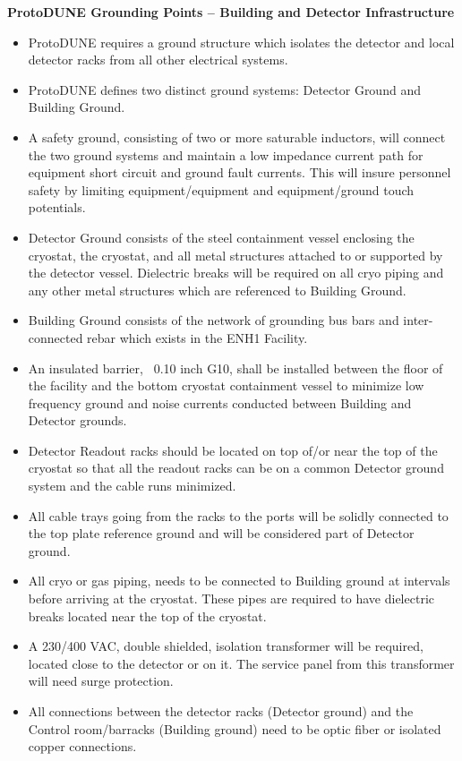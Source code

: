 \textbf{ProtoDUNE Grounding Points – Building and Detector Infrastructure}
\begin{itemize}
\item ProtoDUNE requires a ground structure which isolates the detector and local detector racks from all other electrical systems.
\item ProtoDUNE defines two distinct ground systems:  Detector Ground and Building Ground.
\item A safety ground, consisting of two or more saturable inductors, will connect the two ground systems and maintain a low impedance current path for equipment short circuit and ground fault currents.   This will insure personnel safety by limiting equipment/equipment and equipment/ground touch potentials.
\item Detector Ground consists of the steel containment vessel enclosing the cryostat, the cryostat, and all metal structures attached to or supported by the detector vessel. Dielectric breaks will be required on all cryo piping and any other metal structures which are referenced to Building Ground. 
\item Building Ground consists of the network of grounding bus bars and inter-connected rebar which exists in the ENH1 Facility.
\item An insulated barrier, ~0.10 inch G10, shall be installed between the floor of the facility and the bottom cryostat containment vessel to minimize low frequency ground and noise currents conducted between Building and Detector grounds.
\item Detector Readout racks should be located on top of/or near the top of the cryostat so that all the readout racks can be on a common Detector ground system and the cable runs minimized.
\item All cable trays going from the racks to the ports will be solidly connected to the top plate reference ground and will be considered part of Detector ground.
\item All cryo or gas piping, needs to be connected to Building ground at intervals before arriving at the cryostat. These pipes are required to have dielectric breaks located near the top of the cryostat.
\item A 230/400 VAC, double shielded, isolation transformer will be required, located close to the detector or on it. The service panel from this transformer will need surge protection.
\item All connections between the detector racks (Detector ground) and the Control room/barracks (Building ground) need to be optic fiber or isolated copper connections.

\end{itemize}
